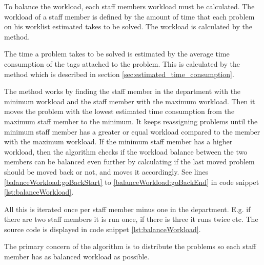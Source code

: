To balance the workload, each staff members workload must be calculated. 
The workload of a staff member is defined by the amount of time that each problem on his worklist estimated takes to be solved. 
The workload is calculated by the  method.

The time a problem takes to be solved is estimated by the average time consumption of the tags attached to the problem. 
This is calculated by the  method which is described in section \ref{sec:estimated_time_consumption}.

The  method works by finding the staff member in the department with the minimum workload and the staff member with the maximum workload. Then it moves the problem with the lowest estimated time consumption from the maximum staff member to the minimum. 
It keeps reassigning problems until the minimum staff member has a greater or equal workload compared to the \astaff[] member with the maximum workload.
If the minimum staff member has a higher workload, then the algorithm checks if the workload balance between the two \astaff[] members can be balanced even further by calculating if the last moved problem should be moved back or not, and moves it accordingly.
See lines \ref{balanceWorkload:goBackStart} to \ref{balanceWorkload:goBackEnd} in code snippet \ref{lst:balanceWorkload}.


All this is iterated once per staff member minus one in the department. 
E.g. if there are two staff members it is run once, if there is three it runs twice etc. 
The source code is displayed in code snippet \ref{lst:balanceWorkload}.

The primary concern of the algorithm is to distribute the problems so each staff member has as balanced workload as possible.


